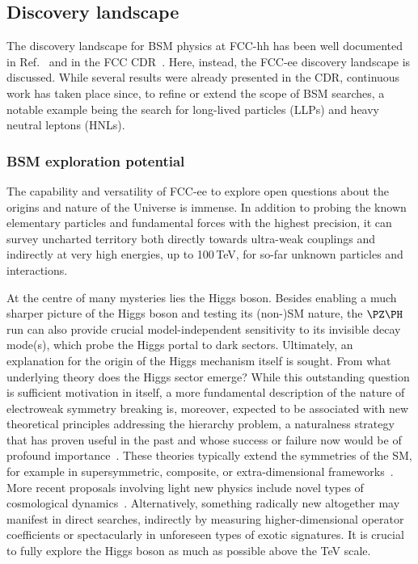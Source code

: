 \subsection{Discovery landscape}
\label{sec:PhysicsCaseBSM}

The discovery landscape for BSM physics at FCC-hh has been well documented in Ref.~\cite{Mangano:2017tke} 
and in the FCC CDR~\cite{fcc-phys-cdr}.  
Here, instead, the FCC-ee discovery landscape is discussed. 
While several results were already presented in the CDR, 
continuous work has taken place since, to refine or extend the scope of BSM searches, 
a notable example being the search for long-lived particles (LLPs) and heavy neutral leptons (HNLs).

\subsubsection{BSM exploration potential}

The capability and versatility of FCC-ee to explore open questions about the origins and nature of the Universe is immense. 
In addition to probing the known elementary particles and fundamental forces with the highest precision, 
it can survey uncharted territory both directly towards ultra-weak couplings and indirectly at very high energies, 
up to 100\,TeV, for so-far unknown particles and interactions. 

At the centre of many mysteries lies the Higgs boson. 
Besides enabling a much sharper picture of the Higgs boson and testing its (non-)SM nature, 
the $\PZ\PH$ run can also provide crucial model-independent sensitivity to its invisible decay mode(s), 
which probe the Higgs portal to dark sectors. 
Ultimately, an explanation for the origin of the Higgs mechanism itself is sought. 
From what underlying theory does the Higgs sector emerge? 
While this outstanding question is sufficient motivation in itself, 
a more fundamental description of the nature of electroweak symmetry breaking is, moreover, 
expected to be associated with new theoretical principles addressing the hierarchy problem, 
a naturalness strategy that has proven useful in the past 
and whose success or failure now would be of profound importance~\cite{Giudice:2008bi, Craig:2022uua}. 
These theories typically extend the symmetries of the SM, for example in supersymmetric, composite, 
or extra-dimensional frameworks~\cite{Fox:2022tzz}. 
More recent proposals involving light new physics include novel types of cosmological dynamics~\cite{Asadi:2022njl}. 
Alternatively, something radically new altogether may manifest in direct searches, 
indirectly by measuring higher-dimensional operator coefficients 
or spectacularly in unforeseen types of exotic signatures. 
It is crucial to fully explore the Higgs boson as much as possible above the TeV scale.

